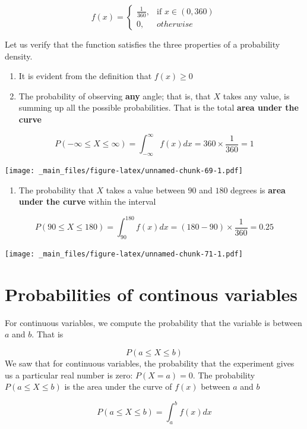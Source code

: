 \documentclass[
]{book}
\providecommand{\tightlist}{%
  \setlength{\itemsep}{0pt}\setlength{\parskip}{0pt}}
\begin{document}
\[
    f(x)= 
\begin{cases}
    \frac{1}{360},& \text{if } x\in (0,360)\\
    0,& otherwise 
\end{cases}
\]

Let us verify that the function satisfies the three properties of a probability density.

\begin{enumerate}
\def\labelenumi{\arabic{enumi})}
\item
  It is evident from the definition that \(f(x) \geq 0\)
\item
  The probability of observing \textbf{any} angle; that is, that \(X\) takes any value, is summing up all the possible probabilities. That is the total \textbf{area under the curve}
\end{enumerate}

\[P(-\infty\leq X \leq \infty)= \int_{-\infty}^{\infty} f(x) dx  = 360\times \frac{1}{360}= 1\]

\texttt{[image: \_main\_files/figure-latex/unnamed-chunk-69-1.pdf]}

\begin{enumerate}
\def\labelenumi{\arabic{enumi})}
\setcounter{enumi}{2}
\tightlist
\item
  The probability that \(X\) takes a value between \(90\) and \(180\) degrees is \textbf{area under the curve} within the interval
\end{enumerate}

\[P(90 \leq X \leq 180) = \int_{90}^{180} f(x) dx = (180-90)\times \frac{1}{360}=0.25\]

\texttt{[image: \_main\_files/figure-latex/unnamed-chunk-71-1.pdf]}

\hypertarget{probabilities-of-continous-variables}{%
\section{Probabilities of continous variables}\label{probabilities-of-continous-variables}}

For continuous variables, we compute the probability that the variable is between \(a\) and \(b\). That is

\[P(a \leq X \leq b)\]
We saw that for continuous variables, the probability that the experiment gives us a particular real number is zero: \(P(X=a)=0\). The probability \(P(a \leq X \leq b)\) is the area under the curve of \(f(x)\) between \(a\) and \(b\)

\[P(a \leq X \leq b) = \int_{a}^{b} f(x) dx\]
\end{document}
